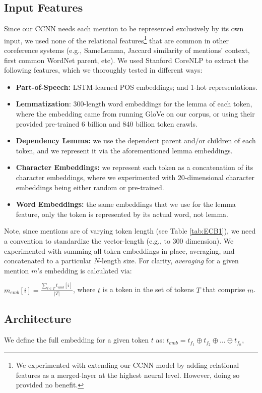 \documentclass[11pt,a4paper]{article}
\begin{document}
\subsection{Input Features}
\label{sec:features}
Since our CCNN needs each mention to be represented exclusively by its own input, we used none of the relational features\footnote{We experimented with extending our CCNN model by adding relational features as a merged-layer at the highest neural level.  However, doing so provided no benefit.} that are common in other coreference systems (e.g., SameLemma, Jaccard similarity of mentions' context, first common WordNet parent, etc).  We used Stanford CoreNLP \cite{manning-EtAl:2014:P14-5} to extract the following features, which we thoroughly tested in different ways:
\begin{itemize}
  \item \textbf{Part-of-Speech:} LSTM-learned POS embeddings; and 1-hot representations.
  \item \textbf{Lemmatization}: 300-length word embeddings for the lemma of each token, where the embedding came from running GloVe \cite{pennington2014glove} on our corpus, or using their provided pre-trained 6 billion and 840 billion token crawls.
  \item \textbf{Dependency Lemma:} we use the dependent parent and/or children of each token, and we represent it via the aforementioned lemma embeddings.
  \item \textbf{Character Embeddings:} we represent each token as a concatenation of its character embeddings, where we experimented with 20-dimensional character embeddings being either random or pre-trained.
  \item \textbf{Word Embeddings:} the same embeddings that we use for the lemma feature, only the token is represented by its actual word, not lemma.
\end{itemize}
Note, since mentions are of varying token length (see Table \ref{tab:ECB1}), we need a convention to standardize the vector-length (e.g., to 300 dimension).  We experimented with summing all token embeddings in place, averaging, and concatenated to a particular $N$-length size.  For clarity, \textit{averaging} for a given mention $m$'s embedding is calculated via:

$m_{emb}[i] = \frac{\sum_{t \in T}t_{emb}[i]}{|T|}$, where $t$ is a token in the set of tokens $T$ that comprise $m$.

\subsection{Architecture}
We define the full embedding for a given token $t$ as: $t_{emb} = t_{f_{1}} \oplus t_{f_{2}} \oplus \ldots \oplus t_{f_{n}},$
\end{document}
